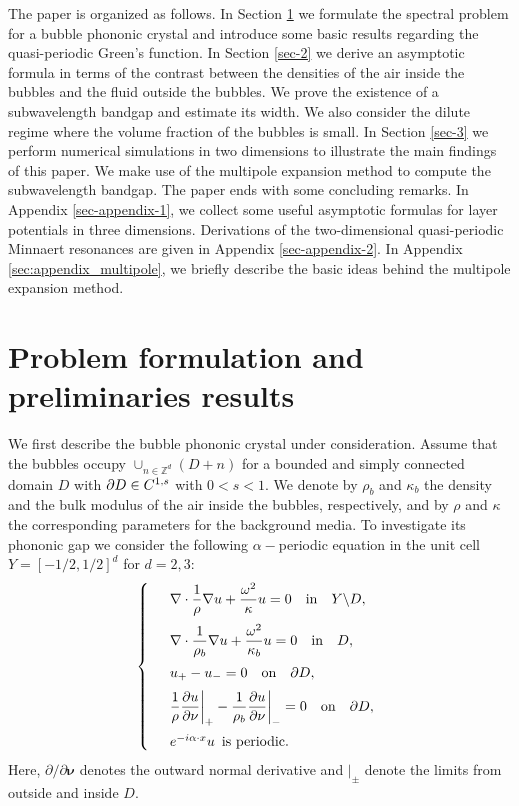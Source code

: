 \documentclass[11pt]{article}
\numberwithin{equation}{section}
\newcommand{\ds}{\displaystyle}
\def\nm{\noalign{\medskip}}
\def\bnu{{\mathbf{\nu}}}
\newcommand\1{{\ensuremath {\mathds 1} }}
\def\be{\begin{equation}} \def\ee{\end{equation}}
\begin{document}
The paper is organized as follows. In Section \ref{sec-1}
we formulate the spectral problem for a bubble phononic crystal and introduce some basic results regarding the quasi-periodic Green's function. In Section \ref{sec-2} we derive an asymptotic formula in terms of the contrast between the densities of the air inside the bubbles and the fluid outside the bubbles. We prove the existence of a subwavelength bandgap and estimate its width. We also consider the dilute regime where the volume fraction of the bubbles is small. In Section \ref{sec-3} we perform numerical simulations in two dimensions to illustrate the main findings of this paper.  We make use of the multipole expansion method to compute the subwavelength bandgap. The paper ends with some concluding remarks. 
In Appendix \ref{sec-appendix-1}, we collect some useful asymptotic formulas for layer potentials in three dimensions.  Derivations of the two-dimensional quasi-periodic Minnaert resonances are given in Appendix \ref{sec-appendix-2}. In Appendix \ref{sec:appendix_multipole}, we briefly describe the basic ideas behind the multipole expansion method.  



\section{Problem formulation and preliminaries results} \label{sec-1}


We first describe the bubble phononic crystal under consideration. 
Assume that the bubbles occupy  $\cup_{n\in \mathbb{Z}^d} (D+n)$ for a bounded and simply connected domain $D$ with $\partial D \in C^{1, s}$ with $0<s<1$. 
We denote by $\rho_b$ and $\kappa_b$ the density and the bulk modulus of the air inside the bubbles, respectively, and by $\rho$ and $\kappa$ the corresponding parameters for the background media. 
To investigate its phononic gap we consider the following $\alpha-$periodic equation in the unit cell $Y=[-1/2,1/2]^d$ for $d=2,3$:
\be \label{eq-scattering}
\left\{
\begin{array} {ll}
&\ds \nabla \cdot \f{1}{\rho} \nabla  u+ \frac{\omega^2}{\kappa} u  = 0 \quad \text{in} \quad Y \backslash D, \\
\nm
&\ds \nabla \cdot \f{1}{\rho_b} \nabla  u+ \frac{\omega^2}{\kappa_b} u  = 0 \quad \text{in} \quad D, \\
\nm
&\ds  u_{+} -u_{-}  =0   \quad \text{on} \quad \partial D, \\
\nm
& \ds  \f{1}{\rho} \f{\p u}{\p \bnu} \bigg|_{+} - \f{1}{\rho_b} \f{\p u}{\p \bnu} \bigg|_{-} =0 \quad \text{on} \quad \partial D,\\
\nm
&  e^{-i \alpha \cdot x} u  \,\,\,  \mbox{is periodic.}
  \end{array}
 \right.
\ee
Here, $\partial/\partial \bnu$ denotes the outward normal derivative and $|_\pm$ denote the limits from outside and inside $D$.  
\end{document}
